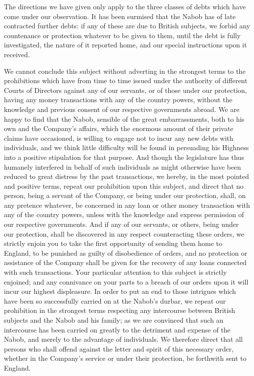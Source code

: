 The directions we have given only apply to the three classes of debts which have come under our observation. It has been surmised that the Nabob has of late contracted further debts: if any of these are due to British subjects, we forbid any countenance or protection whatever to be given to them, until the debt is fully investigated, the nature of it reported home, and our special instructions upon it received.

We cannot conclude this subject without adverting in the strongest terms to the prohibitions which have from time to time issued under the authority of different Courts of Directors against any of our servants, or of those under our protection, having any money transactions with any of the country powers, without the knowledge and previous consent of our respective governments abroad. We are happy to find that the Nabob, sensible of the great embarrassments, both to his own and the Company's affairs, which the enormous amount of their private claims have occasioned, is willing to engage not to incur any new debts with individuals, and we think little difficulty will be found in persuading his Highness into a positive stipulation for that purpose. And though the legislature has thus humanely interfered in behalf of such individuals as might otherwise have been reduced to great distress by the past transactions, we hereby, in the most pointed and positive terms, repeat our prohibition upon this subject, and direct that no person, being a servant of the Company, or being under our protection, shall, on any pretence whatever, be concerned in any loan or other money transaction with any of the country powers, unless with the knowledge and express permission of our respective governments. And if any of our servants, or others, being under our protection, shall be discovered in any respect counteracting these orders, we strictly enjoin you to take the first opportunity of sending them home to England, to be punished as guilty of disobedience of orders, and no protection or assistance of the Company shall be given for the recovery of any loans connected with such transactions. Your particular attention to this subject is strictly enjoined; and any connivance on your parts to a breach of our orders upon it will incur our highest displeasure. In order to put an end to those intrigues which have been so successfully carried on at the Nabob's durbar, we repeat our prohibition in the strongest terms respecting any intercourse between British subjects and the Nabob and his family; as we are convinced that such an intercourse has been carried on greatly to the detriment and expense of the Nabob, and merely to the advantage of individuals. We therefore direct that all persons who shall offend against the letter and spirit of this necessary order, whether in the Company's service or under their protection, be forthwith sent to England.

